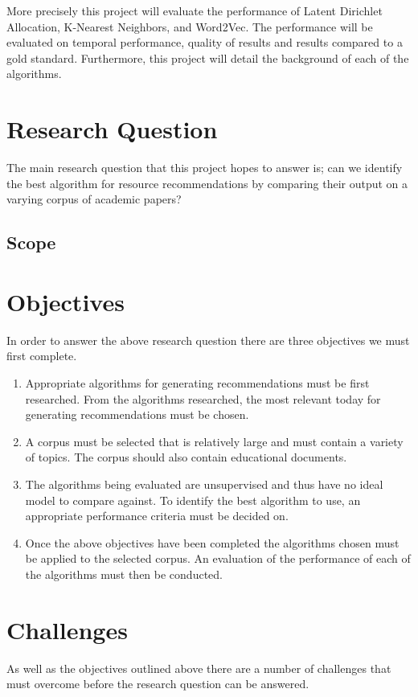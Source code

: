 More precisely this project will evaluate the performance of Latent Dirichlet Allocation, K-Nearest Neighbors, and Word2Vec.
The performance will be evaluated on temporal performance, quality of results and results compared to a gold standard.
Furthermore, this project will detail the background of each of the algorithms.

\section{Research Question}
The main research question that this project hopes to answer is; can we identify the best algorithm for resource recommendations by comparing their output on a varying corpus of academic papers?

\subsection{Scope}


\section{Objectives}
In order to answer the above research question there are three objectives we must first complete.

\begin{enumerate}
    \item Appropriate algorithms for generating recommendations must be first researched.
    From the algorithms researched, the most relevant today for generating recommendations must be chosen.

    \item A corpus must be selected that is relatively large and must contain a variety of topics.
    The corpus should also contain educational documents.

    \item The algorithms being evaluated are unsupervised and thus have no ideal model to compare against.
    To identify the best algorithm to use, an appropriate performance criteria must be decided on.

    \item Once the above objectives have been completed the algorithms chosen must be applied to the selected corpus.
    An evaluation of the performance of each of the algorithms must then be conducted.
\end{enumerate}

\section{Challenges}
As well as the objectives outlined above there are a number of challenges that must overcome before the research question can be answered.

